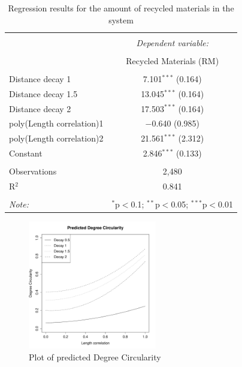 \documentclass[fleqn,10pt]{wlscirep}
\begin{document}
{\begin{table}[]  \centering
  \caption{Regression results for the amount of recycled materials in the system } 
  \label{Reg1} 
\begin{tabular}{@{\extracolsep{5pt}}lc} 
\\[-1.8ex]\hline 
\hline \\[-1.8ex] 
 & \multicolumn{1}{c}{\textit{Dependent variable:}} \\ 
\cline{2-2} 
\\[-1.8ex] & Recycled Materials (RM) \\ 
\hline \\[-1.8ex] 
 Distance decay 1 & 7.101$^{***}$ (0.164) \\ 
 Distance decay 1.5 & 13.045$^{***}$ (0.164) \\ 
 Distance decay 2 & 17.503$^{***}$ (0.164) \\ 
 poly(Length correlation)1 & $-$0.640 (0.985) \\ 
 poly(Length correlation)2 & 21.561$^{***}$ (2.312) \\ 
 Constant & 2.846$^{***}$ (0.133) \\ 
\hline \\[-1.8ex] 
Observations & 2,480 \\ 
R$^{2}$ & 0.841 \\ 
\hline 
\hline \\[-1.8ex] 
\textit{Note:}  & \multicolumn{1}{r}{$^{*}$p$<$0.1; $^{**}$p$<$0.05; $^{***}$p$<$0.01} \\ 
\end{tabular} 
\end{table} 

\begin{figure}
\centering
\includegraphics[width=0.5\textwidth]{Lcor2.pdf}
\caption{Plot of predicted Degree Circularity}
\label{Pred1}
\end{figure}

}
\end{document}
